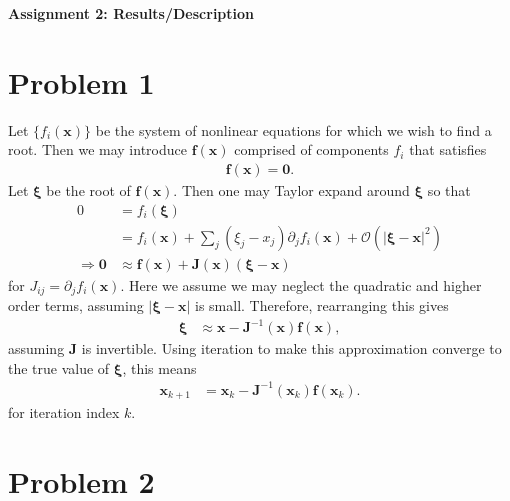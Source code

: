 \documentclass[12pt]{article}
\begin{document}
\begin{center}\begin{LARGE}
\textbf{Assignment 2: Results/Description}
\end{LARGE}\end{center}

\section*{Problem 1}

Let $\{f_i(\boldsymbol{x})\}$ be the system of nonlinear equations for which
we wish to find a root. Then we may introduce $\boldsymbol{f}(\boldsymbol{x})$
comprised of components $f_i$ that satisfies
$$
\begin{aligned}
\boldsymbol{f}(\boldsymbol{x})
= \boldsymbol{0}.
\end{aligned}
$$
Let $\boldsymbol{\xi}$ be the root of $\boldsymbol{f}(\boldsymbol{x})$. Then
one may Taylor expand around $\boldsymbol{\xi}$ so that
$$
\begin{aligned}
0
&= f_i(\boldsymbol{\xi}) \\
&= f_i(\boldsymbol{x}) + \sum_j (\xi_j - x_j) \partial_j f_i(\boldsymbol{x})
  + \mathcal{O}(|\boldsymbol{\xi} - \boldsymbol{x}|^2) \\
\Rightarrow
\boldsymbol{0}
&\approx \boldsymbol{f}(\boldsymbol{x})
  + \boldsymbol{J}(\boldsymbol{x}) (\boldsymbol{\xi} - \boldsymbol{x})
\end{aligned}
$$
for $J_{ij} = \partial_j f_i(\boldsymbol{x})$. Here we assume we may neglect
the quadratic and higher order terms, assuming
$|\boldsymbol{\xi} - \boldsymbol{x}|$ is small. Therefore, rearranging this
gives
$$
\begin{aligned}
\boldsymbol{\xi}
&\approx \boldsymbol{x} - \boldsymbol{J}^{-1}(\boldsymbol{x})
    \boldsymbol{f}(\boldsymbol{x}),
\end{aligned}
$$
assuming $\boldsymbol{J}$ is invertible. Using iteration to make this
approximation converge to the true value of $\boldsymbol{\xi}$, this means
$$
\begin{aligned}
\boldsymbol{x}_{k+1}
&= \boldsymbol{x}_k - \boldsymbol{J}^{-1}(\boldsymbol{x}_k)
    \boldsymbol{f}(\boldsymbol{x}_k).
\end{aligned}
$$
for iteration index $k$.

\section*{Problem 2}
\end{document}

